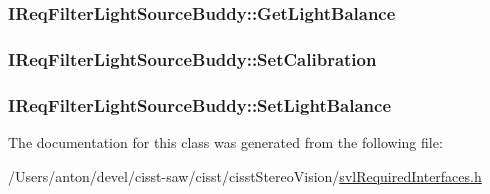 \subsubsection[{Get\+Light\+Balance}]{ I\+Req\+Filter\+Light\+Source\+Buddy\+::\+Get\+Light\+Balance}\label{class_i_req_filter_light_source_buddy_a02d7dd402542d60b0e2a8eab49ae0996}
\hypertarget{class_i_req_filter_light_source_buddy_a935725df98772111c6bb59934969bbad}{}
\subsubsection[{Set\+Calibration}]{ I\+Req\+Filter\+Light\+Source\+Buddy\+::\+Set\+Calibration}\label{class_i_req_filter_light_source_buddy_a935725df98772111c6bb59934969bbad}
\hypertarget{class_i_req_filter_light_source_buddy_a27a4cb9b757819473851dc8ba62e1241}{}
\subsubsection[{Set\+Light\+Balance}]{ I\+Req\+Filter\+Light\+Source\+Buddy\+::\+Set\+Light\+Balance}\label{class_i_req_filter_light_source_buddy_a27a4cb9b757819473851dc8ba62e1241}


The documentation for this class was generated from the following file\+:\begin{DoxyCompactItemize}
\item 
/\+Users/anton/devel/cisst-\/saw/cisst/cisst\+Stereo\+Vision/\hyperlink{svl_required_interfaces_8h}{svl\+Required\+Interfaces.\+h}\end{DoxyCompactItemize}
